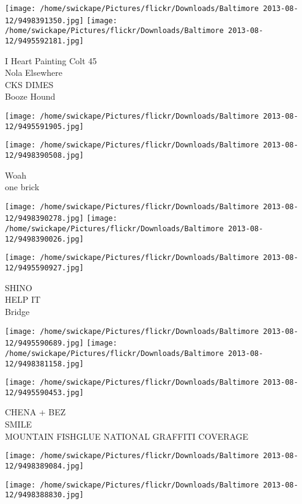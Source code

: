 \documentclass[10pt,letterpaper]{article}
\begin{document}
\texttt{[image: /home/swickape/Pictures/flickr/Downloads/Baltimore 2013-08-12/9498391350.jpg]}
\texttt{[image: /home/swickape/Pictures/flickr/Downloads/Baltimore 2013-08-12/9495592181.jpg]}

I Heart Painting Colt 45\\
Nola Elsewhere\\
CKS DIMES\\
Booze Hound\\
\pagebreak

\texttt{[image: /home/swickape/Pictures/flickr/Downloads/Baltimore 2013-08-12/9495591905.jpg]}

\vspace{0.25in}
\texttt{[image: /home/swickape/Pictures/flickr/Downloads/Baltimore 2013-08-12/9498390508.jpg]}

Woah\\
one brick\\
\pagebreak

\texttt{[image: /home/swickape/Pictures/flickr/Downloads/Baltimore 2013-08-12/9498390278.jpg]}
\texttt{[image: /home/swickape/Pictures/flickr/Downloads/Baltimore 2013-08-12/9498390026.jpg]}

\vspace{0.25in}
\texttt{[image: /home/swickape/Pictures/flickr/Downloads/Baltimore 2013-08-12/9495590927.jpg]}

SHINO\\
HELP IT\\
Bridge\\
\pagebreak

\texttt{[image: /home/swickape/Pictures/flickr/Downloads/Baltimore 2013-08-12/9495590689.jpg]}
\texttt{[image: /home/swickape/Pictures/flickr/Downloads/Baltimore 2013-08-12/9498381158.jpg]}

\texttt{[image: /home/swickape/Pictures/flickr/Downloads/Baltimore 2013-08-12/9495590453.jpg]}

CHENA + BEZ\\
SMILE\\
MOUNTAIN FISHGLUE NATIONAL GRAFFITI COVERAGE\\
\pagebreak

\texttt{[image: /home/swickape/Pictures/flickr/Downloads/Baltimore 2013-08-12/9498389084.jpg]}

\vspace{0.25in}
\texttt{[image: /home/swickape/Pictures/flickr/Downloads/Baltimore 2013-08-12/9498388830.jpg]}
\end{document}
